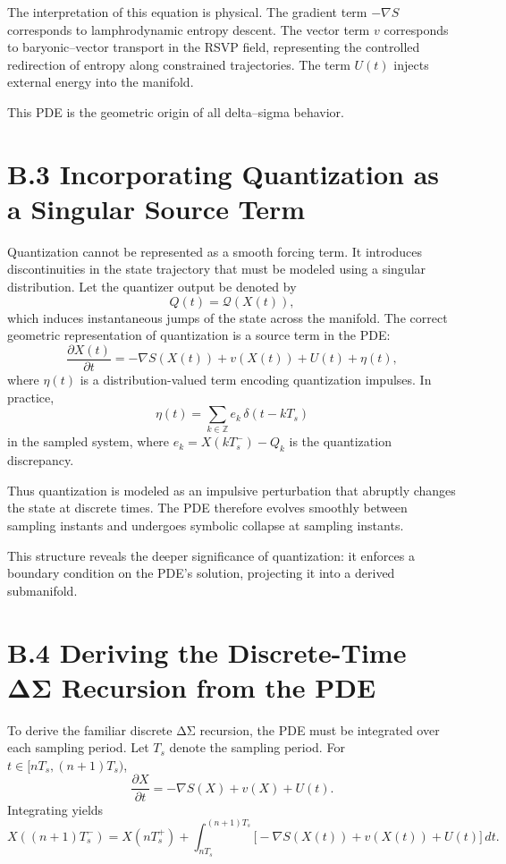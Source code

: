 The interpretation of this equation is physical. The gradient term \(-\nabla S\) corresponds to lamphrodynamic entropy descent. The vector term \(v\) corresponds to baryonic–vector transport in the RSVP field, representing the controlled redirection of entropy along constrained trajectories. The term \(U(t)\) injects external energy into the manifold.

This PDE is the geometric origin of all delta–sigma behavior.

\section{B.3 Incorporating Quantization as a Singular Source Term}

Quantization cannot be represented as a smooth forcing term. It introduces discontinuities in the state trajectory that must be modeled using a singular distribution. Let the quantizer output be denoted by
\[
Q(t) = \mathcal{Q}(X(t)),
\]
which induces instantaneous jumps of the state across the manifold. The correct geometric representation of quantization is a source term in the PDE:
\[
\frac{\partial X(t)}{\partial t} = -\nabla S(X(t)) + v(X(t)) + U(t) + \eta(t),
\]
where \(\eta(t)\) is a distribution-valued term encoding quantization impulses. In practice,
\[
\eta(t) = \sum_{k\in\mathbb{Z}} e_k \, \delta(t - kT_s)
\]
in the sampled system, where \(e_k = X(kT_s^{-}) - Q_k\) is the quantization discrepancy.

Thus quantization is modeled as an impulsive perturbation that abruptly changes the state at discrete times. The PDE therefore evolves smoothly between sampling instants and undergoes symbolic collapse at sampling instants.

This structure reveals the deeper significance of quantization: it enforces a boundary condition on the PDE’s solution, projecting it into a derived submanifold.

\section{B.4 Deriving the Discrete-Time ΔΣ Recursion from the PDE}

To derive the familiar discrete ΔΣ recursion, the PDE must be integrated over each sampling period. Let \(T_s\) denote the sampling period. For \(t \in [nT_s,(n+1)T_s)\),
\[
\frac{\partial X}{\partial t} = -\nabla S(X) + v(X) + U(t).
\]
Integrating yields
\[
X((n+1)T_s^{-}) = X(nT_s^{+}) + \int_{nT_s}^{(n+1)T_s} \bigl[-\nabla S(X(t)) + v(X(t)) + U(t)\bigr]\, dt.
\]

